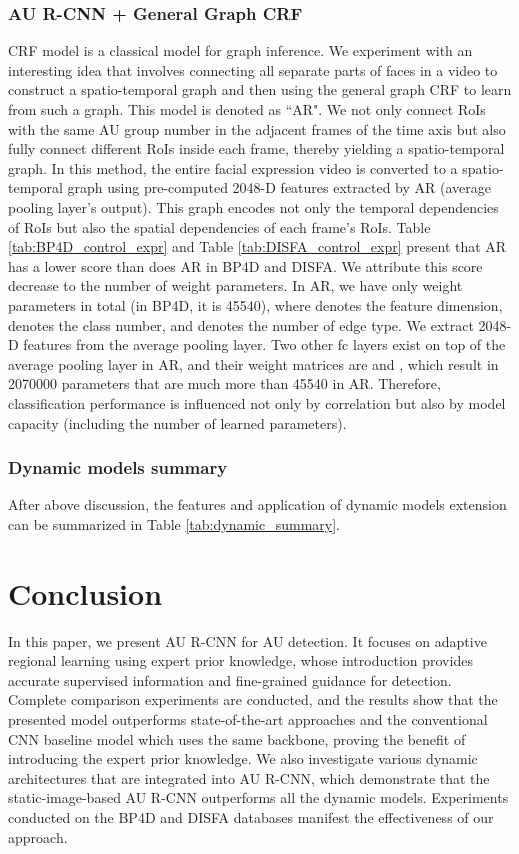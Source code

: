 \documentclass[5p,twocolumn]{elsarticle}
\begin{document}
\subsubsection{AU R-CNN + General Graph CRF}
CRF model is a classical model for graph inference. We experiment with an interesting idea that involves connecting all separate parts of faces in a video to construct a spatio-temporal graph and then using the general graph CRF to learn from such a graph. This model is denoted as ``AR". We not only connect RoIs with the same AU group number in the adjacent frames of the time axis but also fully connect different RoIs inside each frame, thereby yielding a spatio-temporal graph. In this method, the entire facial expression video is converted to a spatio-temporal graph using pre-computed 2048-D features extracted by AR (average pooling layer's output). This graph encodes not only the temporal dependencies of RoIs but also the spatial dependencies of each frame's RoIs. Table \ref{tab:BP4D_control_expr} and Table \ref{tab:DISFA_control_expr} present that AR has a lower score than does AR in BP4D and DISFA. We attribute this score decrease to the number of weight parameters. In AR, we have only  weight parameters in total (in BP4D, it is \num{45540}), where  denotes the feature dimension,  denotes the class number, and  denotes the number of edge type. We extract 2048-D features from the average pooling layer. Two other fc layers exist on top of the average pooling layer in AR, and their weight matrices are  and , which result in \num{2070000} parameters that are much more than \num{45540} in AR. Therefore, classification performance is influenced not only by correlation but also by model capacity (including the number of learned parameters).

\subsubsection{Dynamic models summary}
After above discussion, the features and application of dynamic models extension can be summarized in Table \ref{tab:dynamic_summary}.



\section{Conclusion}

In this paper, we present AU R-CNN for AU detection. It focuses on adaptive regional learning using expert prior knowledge, whose introduction provides accurate supervised information and fine-grained guidance for detection. Complete comparison experiments are conducted, and the results show that the presented model outperforms state-of-the-art approaches and the conventional CNN baseline model which uses the same backbone, proving the benefit of introducing the expert prior knowledge. We also investigate various dynamic architectures that are integrated into AU R-CNN, which demonstrate that the static-image-based AU R-CNN outperforms all the dynamic models. Experiments conducted on the BP4D and DISFA databases manifest the effectiveness of our approach.
\end{document}
